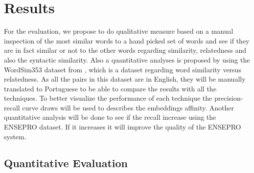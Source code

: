 \section{Results}\label{chap:results}




For the evaluation, we propose to do qualitative measure based on a manual inspection of the most similar words to a hand picked set of words and see if they are in fact similar or not to the other words regarding similarity, relatedness and also the syntactic similarity.
Also a quantitative analyses is proposed by using the WordSim353 dataset from , which is a dataset regarding word similarity versus relatedness. As all the pairs in this dataset are in English, they will be manually translated to Portuguese to be able to compare the results with all the techniques.
To better visualize the performance of each technique the precision-recall curve draws will be used to describes the embeddings affinity.
Another quantitative analysis will be done to see if the recall increase using the ENSEPRO dataset. If it increases it will improve the quality of the ENSEPRO system. 




\subsection{Quantitative Evaluation}\label{chap:results:quantitative}




